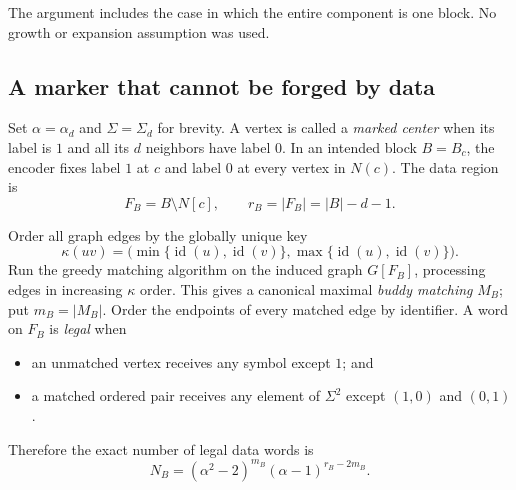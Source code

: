 \documentclass[11pt]{article}
\theoremstyle{definition}
\theoremstyle{remark}
\newcommand{\id}{\operatorname{id}}
\begin{document}
The argument includes the case in which the entire component is one block.
No growth or expansion assumption was used.

\subsection{A marker that cannot be forged by data}

Set $\alpha=\alpha_d$ and $\Sigma=\Sigma_d$ for brevity.  A vertex is called
a \emph{marked center} when its label is $1$ and all its $d$ neighbors have
label $0$.  In an intended block $B=B_c$, the encoder fixes label $1$ at $c$
and label $0$ at every vertex in $N(c)$.  The data region is
\[
                    F_B=B\setminus N[c],\qquad
                    r_B=|F_B|=|B|-d-1.                         \tag{4.4}
\]

Order all graph edges by the globally unique key
\[
 \kappa(uv)=\bigl(\min\{\id(u),\id(v)\},
                   \max\{\id(u),\id(v)\}\bigr).              \tag{4.5}
\]
Run the greedy matching algorithm on the induced graph $G[F_B]$, processing
edges in increasing $\kappa$ order.  This gives a canonical maximal
\emph{buddy matching} $M_B$; put $m_B=|M_B|$.  Order the endpoints of every
matched edge by identifier.  A word on $F_B$ is \emph{legal} when
\begin{itemize}
\item an unmatched vertex receives any symbol except $1$; and
\item a matched ordered pair receives any element of $\Sigma^2$ except
      $(1,0)$ and $(0,1)$.
\end{itemize}
Therefore the exact number of legal data words is
\[
                N_B=(\alpha^2-2)^{m_B}
                     (\alpha-1)^{r_B-2m_B}.                    \tag{4.6}
\]
\end{document}
